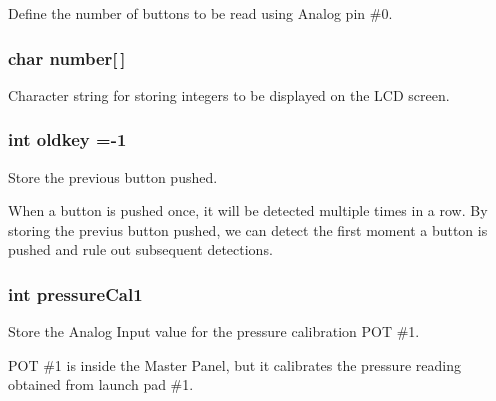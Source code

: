 Define the number of buttons to be read using Analog pin \#0. 

\subsubsection[{\texorpdfstring{number}{number}}]{\setlength{\rightskip}{0pt plus 5cm}char number\mbox{[}$\,$\mbox{]}}\hypertarget{masterPanel_8ino_a0ea7c2d76ab718bd82cf6259b26ed3ed}{}\label{masterPanel_8ino_a0ea7c2d76ab718bd82cf6259b26ed3ed}


Character string for storing integers to be displayed on the L\+CD screen. 

\subsubsection[{\texorpdfstring{oldkey}{oldkey}}]{\setlength{\rightskip}{0pt plus 5cm}int oldkey =-\/1}\hypertarget{masterPanel_8ino_ab3d48dbe76030874dd18eb3c6780330e}{}\label{masterPanel_8ino_ab3d48dbe76030874dd18eb3c6780330e}


Store the previous button pushed. 

When a button is pushed once, it will be detected multiple times in a row. By storing the previus button pushed, we can detect the first moment a button is pushed and rule out subsequent detections. 
\subsubsection[{\texorpdfstring{pressure\+Cal1}{pressureCal1}}]{\setlength{\rightskip}{0pt plus 5cm}int pressure\+Cal1}\hypertarget{masterPanel_8ino_a3e1010b728ac3d5d91ffc657006d630f}{}\label{masterPanel_8ino_a3e1010b728ac3d5d91ffc657006d630f}


Store the Analog Input value for the pressure calibration P\+OT \#1. 

P\+OT \#1 is inside the Master Panel, but it calibrates the pressure reading obtained from launch pad \#1. 
